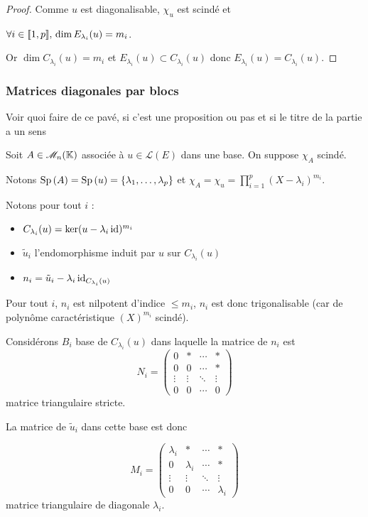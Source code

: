 \begin{proof}
    Comme $u$ est diagonalisable, $\chi_u$ est scindé et 
    
    $\forall i \in [\![1, p]\!], \, \dim E_{\lambda_i}(u) = m_i$.

    Or $\dim C_{\lambda_i}(u) = m_i$ et $E_{\lambda_i}(u) \subset C_{\lambda_i}(u)$ donc 
    $E_{\lambda_i}(u) = C_{\lambda_i}(u)$.
\end{proof}


\subsubsection{Matrices diagonales par blocs}

Voir quoi faire de ce pavé, si c'est une proposition ou pas et si le titre de la partie a un sens 

Soit $A \in \mathscr M_n(\mathbb{K})$ associée à $u \in \mathscr L(E)$ dans une base. On suppose 
$\chi_A$ scindé.

Notons $\operatorname{Sp} \, (A) = \operatorname{Sp} \,(u) = \{\lambda_1, \ldots, \lambda_p\}$ et 
$\chi_A = \chi_u = \displaystyle \prod_{i = 1 }^{ p } (X - \lambda_i)^{m_i}$.

Notons pour tout $i$ : 
\begin{itemize}
    \item $C_{\lambda_i}(u) = \ker (u - \lambda_i \operatorname{id})^{m_i}$
    \item $\tilde u_i$ l'endomorphisme induit par $u$ sur $C_{\lambda_i}(u)$
    \item $n_i = \tilde u_i - \lambda_i \operatorname{id}_{C_{\lambda_i}(u)}$
\end{itemize}

Pour tout $i$, $n_i$ est nilpotent d'indice $\leqslant m_i$, 
$n_i$ est donc trigonalisable (car de polynôme caractéristique $(X)^{m_i}$ scindé).

Considérons $B_i$ base de $C_{\lambda_i}(u)$ dans laquelle la matrice de $n_i$ est 
$$N_i = \begin{pmatrix}
    0 & * & \cdots & * \\
    0 & 0 & \cdots & * \\
    \vdots & \vdots & \ddots & \vdots \\
    0 & 0 & \cdots & 0
\end{pmatrix}$$ matrice triangulaire stricte. 

La matrice de $\tilde u_i$ dans cette base est donc 

$$M_i = \begin{pmatrix}
    \lambda_i & * & \cdots & * \\
    0 & \lambda_i & \cdots & * \\
    \vdots & \vdots & \ddots & \vdots \\
    0 & 0 & \cdots & \lambda_i
\end{pmatrix}$$ matrice triangulaire de diagonale $\lambda_i$.

